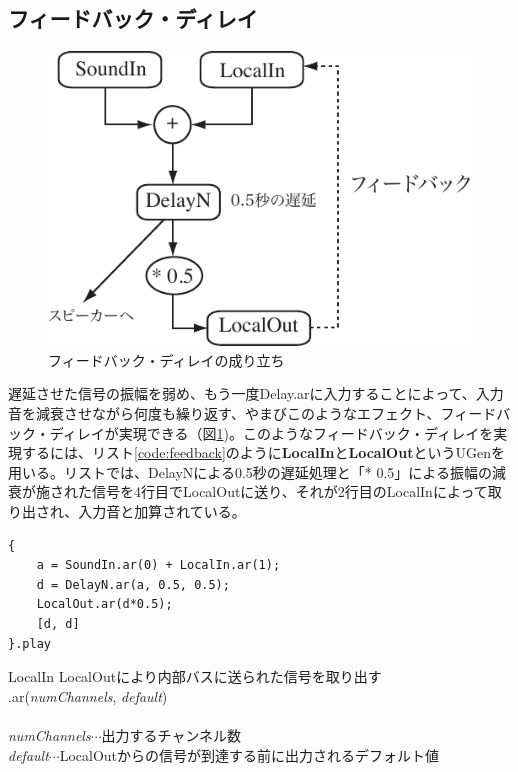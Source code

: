 \documentclass{jsarticle}
\begin{document}
\subsection{フィードバック・ディレイ}
\begin{figure}[htbp]
	\begin{center}
		\includegraphics[scale=0.7]{feedback.pdf}
	\end{center}
	\caption{フィードバック・ディレイの成り立ち}
	\label{fig:feedback}
\end{figure}

遅延させた信号の振幅を弱め、もう一度Delay.arに入力することによって、入力音を減衰させながら何度も繰り返す、やまびこのようなエフェクト、フィードバック・ディレイが実現できる（図\ref{fig:feedback})。このようなフィードバック・ディレイを実現するには、リスト\ref{code:feedback}のように{\bf LocalIn}と{\bf LocalOut}というUGenを用いる。リストでは、DelayNによる0.5秒の遅延処理と「* 0.5」による振幅の減衰が施された信号を4行目でLocalOutに送り、それが2行目のLocalInによって取り出され、入力音と加算されている。

\begin{lstlisting}[caption=フィードバック・ディレイ, label=code:feedback]
{
	a = SoundIn.ar(0) + LocalIn.ar(1);
	d = DelayN.ar(a, 0.5, 0.5);
	LocalOut.ar(d*0.5);
	[d, d]
}.play
\end{lstlisting}

\begin{itembox}[l]{LocalIn}
	{\footnotesize 
	LocalOutにより内部バスに送られた信号を取り出す\\
	.ar({\it numChannels}, {\it default})\\\\
	{\it numChannels}$\cdots$出力するチャンネル数\\
	{\it default}$\cdots$LocalOutからの信号が到達する前に出力されるデフォルト値\\
	}
\end{itembox}
\end{document}
